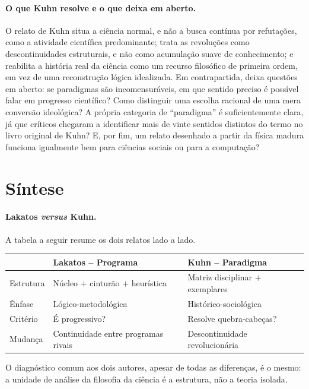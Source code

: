 \documentclass[9pt,a4paper]{extarticle}
\newcommand{\impt}[1]{\textcolor{important}{#1}}
\theoremstyle{definition}
\begin{document}
\paragraph{O que Kuhn resolve e o que deixa em aberto.}
O relato de Kuhn situa a ciência normal, e não a busca contínua por refutações, como a atividade científica predominante; trata as revoluções como descontinuidades estruturais, e não como acumulação suave de conhecimento; e reabilita a história real da ciência como um recurso filosófico de primeira ordem, em vez de uma reconstrução lógica idealizada. Em contrapartida, deixa questões em aberto: se paradigmas são incomensuráveis, em que sentido preciso é possível falar em progresso científico? Como distinguir uma escolha racional de uma mera conversão ideológica? A própria categoria de \enquote{paradigma} é suficientemente clara, já que críticos chegaram a identificar mais de vinte sentidos distintos do termo no livro original de Kuhn? E, por fim, um relato desenhado a partir da física madura funciona igualmente bem para ciências sociais ou para a computação?

\section{Síntese}

\paragraph{Lakatos \emph{versus} Kuhn.}
A tabela a seguir resume os dois relatos lado a lado.

\begin{center}
\begin{tabularx}{\textwidth}{@{}lXX@{}}
\toprule
 & \textbf{Lakatos -- Programa} & \textbf{Kuhn -- Paradigma} \\
\midrule
Estrutura & Núcleo $+$ cinturão $+$ heurística & Matriz disciplinar $+$ exemplares \\
Ênfase & Lógico-metodológica & Histórico-sociológica \\
Critério & É progressivo? & Resolve quebra-cabeças? \\
Mudança & Continuidade entre programas rivais & Descontinuidade revolucionária \\
\bottomrule
\end{tabularx}
\end{center}

O diagnóstico comum aos dois autores, apesar de todas as diferenças, é o mesmo: a unidade de análise da filosofia da ciência é a \impt{estrutura}, não a teoria isolada.
\end{document}

